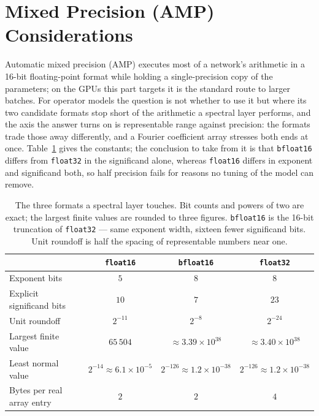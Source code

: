 \section{Mixed Precision (AMP) Considerations}
\label{sec:ch26-amp}

Automatic mixed precision (AMP) executes most of a network's arithmetic in a 16-bit
floating-point format while holding a single-precision copy of the parameters; on the GPUs
this part targets it is the standard route to larger batches. For operator models the
question is not whether to use it but where its two candidate formats stop short of the
arithmetic a spectral layer performs, and the axis the answer turns on is representable range
against precision: the formats trade those away differently, and a Fourier coefficient array
stresses both ends at once. Table~\ref{tab:ch26-formats} gives the constants; the conclusion
to take from it is that \texttt{bfloat16} differs from \texttt{float32} in the significand
alone, whereas \texttt{float16} differs in exponent and significand both, so half precision
fails for reasons no tuning of the model can remove. 

\begin{table}[htbp]
\centering
\small
\caption{The three formats a spectral layer touches. Bit counts and powers of two are exact;
the largest finite values are rounded to three figures. \texttt{bfloat16} is the 16-bit
truncation of \texttt{float32} --- same exponent width, sixteen fewer significand bits. Unit
roundoff is half the spacing of representable numbers near one.}
\label{tab:ch26-formats}
\begin{tabular}{lccc}
\toprule
& \textbf{\texttt{float16}} & \textbf{\texttt{bfloat16}} & \textbf{\texttt{float32}} \\
\midrule
Exponent bits & $5$ & $8$ & $8$ \\
Explicit significand bits & $10$ & $7$ & $23$ \\
Unit roundoff & $2^{-11}$ & $2^{-8}$ & $2^{-24}$ \\
Largest finite value & $65\,504$ & $\approx 3.39\times 10^{38}$ & $\approx 3.40\times 10^{38}$ \\
Least normal value & $2^{-14}\approx 6.1\times 10^{-5}$ & $2^{-126}\approx 1.2\times 10^{-38}$ & $2^{-126}\approx 1.2\times 10^{-38}$ \\
Bytes per real array entry & $2$ & $2$ & $4$ \\
\bottomrule
\end{tabular}
\end{table}

